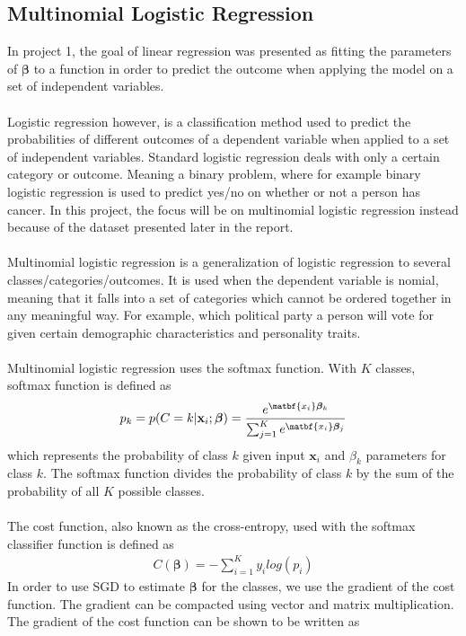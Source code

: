 \documentclass[a4paper,twocolumn]{article}
\newcommand{\B}{\boldsymbol{\beta}}
\begin{document}
\subsection{Multinomial Logistic Regression}
In project 1, the goal of linear regression was presented as fitting the parameters of $\B$ to a function in order to predict the outcome when applying the model on a set of independent variables. \\
\\
Logistic regression however, is a classification method used to predict the probabilities of different outcomes of a dependent variable when applied to a set of independent variables. Standard logistic regression deals with only a certain category or outcome. Meaning a binary problem, where for example binary logistic regression is used to predict yes/no on whether or not a person has cancer. In this project, the focus will be on multinomial logistic regression instead because of the dataset presented later in the report.\\
\\
Multinomial logistic regression is a generalization of logistic regression to several classes/categories/outcomes. It is used when the dependent variable is nomial, meaning that it falls into a set of categories which cannot be ordered together in any meaningful way. For example, which political party a person will vote for given certain demographic characteristics and personality traits.\\
\\
Multinomial logistic regression uses the softmax function. With $K$ classes, softmax function is defined as 
\begin{align}
    p_{k} = p(C = k|\mathbf{x}_{i};\B) = \frac{e^{\matbf{x_{i}}\B_{k}}}{\sum_{j = 1}^{K}e^{\matbf{x_{i}}\B_{j}}}
\end{align}
which represents the probability of class $k$ given input $\mathbf{x}_{i}$ and $\beta_{k}$ parameters for class $k$. The softmax function divides the probability of class $k$ by the sum of the probability of all $K$ possible classes.\\
\\
The cost function, also known as the cross-entropy, used with the softmax classifier function is defined as
\begin{align}
    C(\B) = -\sum_{i=1}^{K}y_{i}log(p_{i})
\end{align}
In order to use SGD to estimate $\B$ for the classes, we use the gradient of the cost function. The gradient can be compacted using vector and matrix multiplication. The gradient of the cost function can be shown to be written as
\end{document}
